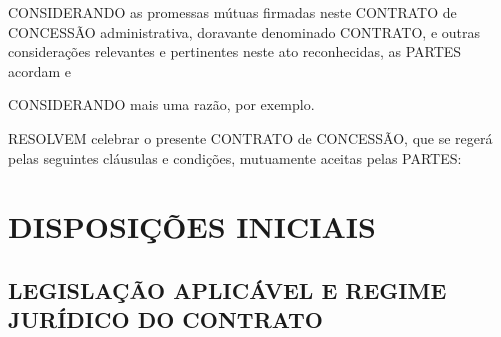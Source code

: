 \documentclass[a4paper,11pt]{report} %
\begin{document}
CONSIDERANDO as promessas mútuas firmadas neste CONTRATO de CONCESSÃO administrativa, doravante denominado CONTRATO, e outras considerações relevantes e pertinentes neste ato reconhecidas, as PARTES acordam e

CONSIDERANDO mais uma razão, por exemplo.

RESOLVEM celebrar o presente CONTRATO de CONCESSÃO, que se regerá pelas seguintes cláusulas e condições, mutuamente aceitas pelas PARTES:

\chapter{DISPOSIÇÕES INICIAIS}
\section{LEGISLAÇÃO APLICÁVEL E REGIME JURÍDICO DO CONTRATO}
\label{sec:PAHT}
\end{document}
